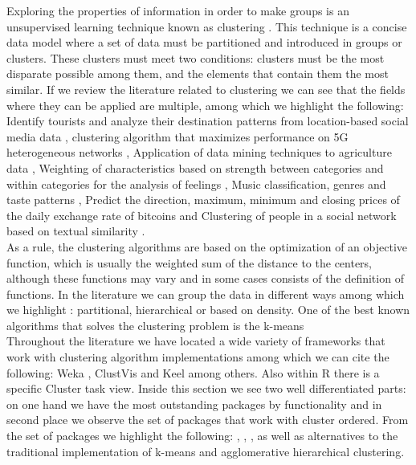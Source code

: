 Exploring the properties of information in order to make groups is an unsupervised learning technique known as clustering \citep{b46} \citep{b47}. This technique is a concise data model where a set of data must be partitioned and introduced in groups or clusters. These clusters must meet two conditions: clusters must be the most disparate possible among them, and the elements that contain them the most similar. If we review the literature related to clustering we can see that the fields where they can be applied are multiple, among which we highlight the following: Identify tourists and analyze their destination patterns from location-based social media data \citep{b1}, clustering algorithm that maximizes performance on 5G heterogeneous networks \citep{b2}, Application of data mining techniques to agriculture data \citep{b3}, Weighting of characteristics based on strength between categories and within categories for the analysis of feelings \citep{b4}, Music classification, genres and taste patterns \citep{b5}, Predict the direction, maximum, minimum and closing prices of the daily exchange rate of bitcoins \citep{b6} and Clustering of people in a social network based on textual similarity \citep{b7}.\\
As a rule, the clustering algorithms are based on the optimization of an objective function, which is usually the weighted sum of the distance to the centers, although these functions may vary and in some cases consists of the definition of functions. In the literature we can group the data in different ways among which we highlight \citep{b48}: partitional, hierarchical or based on density. One of the best known algorithms that solves the clustering problem is the k-means \citep{b49}\\
Throughout the literature we have located a wide variety of frameworks that work with clustering algorithm implementations among which we can cite the following: Weka \citep{b13}, ClustVis \citep{b14} and Keel \citep{b15} among others. Also within R there is a specific Cluster task view. Inside this section we see two well differentiated parts: on one hand we have the most outstanding packages by functionality and in second place we observe the set of packages that work with cluster ordered. From the set of packages we highlight the following:  \citep{b9},  \citep{b10},  \citep{b11},  \citep{b12} as well as alternatives to the traditional implementation of k-means and agglomerative hierarchical clustering.\\
